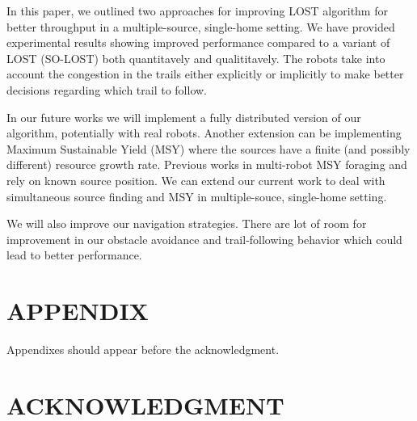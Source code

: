 \documentclass[letterpaper, 10 pt, conference]{ieeeconf}  %
\begin{document}
In this paper, we outlined two approaches for improving LOST algorithm for better throughput in a multiple-source, single-home setting. We have provided experimental results showing improved performance compared to a variant of LOST (SO-LOST) both quantitavely and qualititavely.  The robots take into account the congestion in the trails either explicitly or implicitly to make better decisions regarding which trail to follow. 

In our future works we will implement a fully distributed version of our algorithm, potentially with real robots. Another extension can be implementing Maximum Sustainable Yield (MSY) \cite{MSY_PAPER Hjort et al. 1933 } where the sources have a finite (and possibly different) resource growth rate. Previous works in multi-robot MSY foraging \cite{Song and Vaughan 2013} and \cite{Zhang and Zhao Song 2016} rely on known source position. We can extend our current work to deal with simultaneous source finding and MSY in multiple-souce, single-home setting. 

We will also improve our navigation strategies. There are lot of room for improvement in our obstacle avoidance and trail-following behavior which could lead to better performance. 

\addtolength{\textheight}{-12cm}   %







\section*{APPENDIX}

Appendixes should appear before the acknowledgment.

\section*{ACKNOWLEDGMENT}
\end{document}
